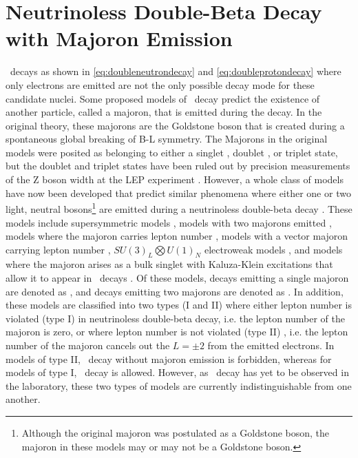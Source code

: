 \section{Neutrinoless Double-Beta Decay with Majoron Emission}
\label{sec:Neutrinoless Double-Beta Decay with Majoron Emisison}
\zeronubb~decays as shown in \autoref{eq:doubleneutrondecay} and \autoref{eq:doubleprotondecay} where only electrons are emitted are not the only possible decay mode for these candidate nuclei.
Some proposed models of \zeronubb~decay predict the existence of another particle, called a majoron, that is emitted during the decay.
In the original theory, these majorons are the Goldstone boson that is created during a spontaneous global breaking of B-L symmetry.
The Majorons in the original models were posited as belonging to either a singlet  \cite{CHIKASHIGE1981265}, doublet \cite{AULAKH1982136}, or triplet \cite{GELMINI1981411} state, but the doublet and triplet states have been ruled out by precision measurements of the Z boson width at the LEP experiment \cite{ALEPH:2005ab}.
However, a whole class of models have now been developed that predict similar phenomena where either one or two light, neutral bosons\footnote{Although the original majoron was postulated as a Goldstone boson, the majoron in these models may or may not be a Goldstone boson.}
are emitted during a neutrinoless double-beta decay \cite{HIRSCH19968}.
These models include supersymmetric models \cite{MASIERO1990273}, models with two majorons emitted \cite{MOHAPATRA1988192}, models where the majoron carries lepton number \cite{Burgess:1992dt, PhysRevD.49.5925, BAMERT199525}, models with a vector majoron carrying lepton number \cite{CARONE199385}, $SU(3)_L\bigotimes U(1)_N$ electroweak models \cite{Montero:2000ar}, and models where the majoron arises as a bulk singlet with Kaluza-Klein excitations that allow it to appear in \zeronubb~decays \cite{Mohapatra:2000px}.
Of these models, decays emitting a single majoron are denoted as \zeronubbonechi, and decays emitting two majorons are denoted as \zeronubbtwochi.
In addition, these models are classified into two types (I and II) where either lepton number is  violated (type I) in neutrinoless double-beta decay, i.e. the lepton number of the majoron is zero, or where lepton number is not violated  (type II) , i.e. the lepton number of the majoron cancels out the $L=\pm2$ from the emitted electrons.
In models of type II, \zeronubb~decay without majoron emission is forbidden, whereas for models of type I, \zeronubb~decay is allowed.
However, as \zeronubb~decay has yet to be observed in the laboratory, these two types of models are currently indistinguishable from one another.
